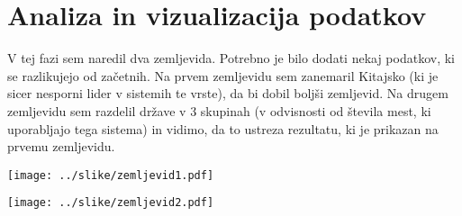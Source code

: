 \documentclass[11pt,a4paper]{article}
\begin{document}



\section{Analiza in vizualizacija podatkov}

V tej fazi sem naredil dva zemljevida. Potrebno je bilo dodati nekaj podatkov, ki se razlikujejo od začetnih. Na prvem zemljevidu sem zanemaril Kitajsko (ki je sicer nesporni lider v sistemih te vrste), da bi dobil boljši zemljevid. Na drugem zemljevidu sem razdelil države v 3 skupinah (v odvisnosti od števila mest, ki uporabljajo tega sistema) in vidimo, da to ustreza rezultatu, ki je prikazan na prvemu zemljevidu.

\texttt{[image: ../slike/zemljevid1.pdf]}

\texttt{[image: ../slike/zemljevid2.pdf]}


% 
% 
\end{document}
